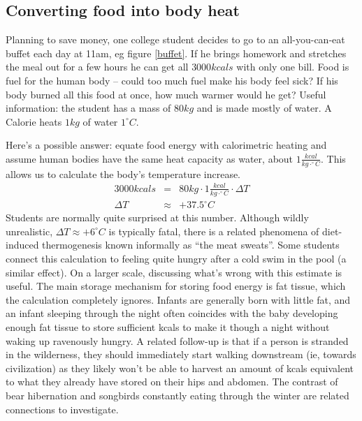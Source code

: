 \documentclass[12pt]{iopart}
\newcommand{\bea}{\begin{eqnarray}}
\newcommand{\eea}{\end{eqnarray}}
\newcommand{\degC}{^{\circ}C}
\begin{document}
\subsection{Converting food into body heat}
Planning to save money, one college student decides to go to an all-you-can-eat buffet each day at 11am, eg figure \ref{buffet}.  If he brings homework and stretches the meal out for a few hours he can get all $3000kcals$ with only one bill.  Food is fuel for the human body -- could too much fuel make his body feel sick? If his body burned all this food at once, how much warmer would he get? 
Useful information: the student has a mass of $80kg$ and is made mostly of water.  A Calorie heats $1 kg$ of water $1^{\circ}C$. 

Here's a possible answer:
equate food energy with calorimetric heating and assume human bodies have the same heat capacity as water, about $1\frac{kcal}{kg\cdot\degC}$. This allows us to calculate the body's temperature increase.
\bea
3000kcals &=& 80kg\cdot1 \frac{kcal}{kg\cdot \degC}\cdot\Delta T \nonumber \\
\Delta T &\approx& +37.5\degC \nonumber
\eea
Students are normally quite surprised at this number.  Although wildly unrealistic, $\Delta T \approx +6\degC$ is typically fatal, there is a related phenomena of diet-induced thermogenesis\cite{meat_sweats} known informally as ``the meat sweats''. Some students connect this calculation to feeling quite hungry after a cold swim in the pool (a similar effect).  On a larger scale, discussing what's wrong with this estimate is useful.  The main storage mechanism for storing food energy is fat tissue, which the calculation completely ignores.  Infants are generally born with little fat, and an infant sleeping through the night often coincides with the baby developing enough fat tissue to store sufficient kcals to make it though a night without waking up ravenously hungry.  A related follow-up is that if a person is stranded in the wilderness, they should immediately start walking downstream (ie, towards civilization) as they likely won't be able to harvest an amount of kcals equivalent to what they already have stored on their hips and abdomen.\cite{trout}  The contrast of bear hibernation \cite{fat_bear} and songbirds constantly eating through the winter are related connections to investigate.
\end{document}
